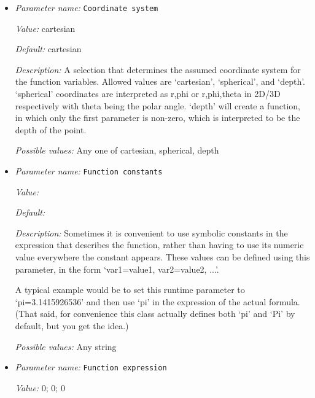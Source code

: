 \begin{itemize}
\item {\it Parameter name:} {\tt Coordinate system}
\label{parameters:Boundary traction model/Function/Coordinate system}
\label{parameters:Boundary_20traction_20model/Function/Coordinate_20system}


{\it Value:} cartesian


{\it Default:} cartesian


{\it Description:} A selection that determines the assumed coordinate system for the function variables. Allowed values are `cartesian', `spherical', and `depth'. `spherical' coordinates are interpreted as r,phi or r,phi,theta in 2D/3D respectively with theta being the polar angle. `depth' will create a function, in which only the first parameter is non-zero, which is interpreted to be the depth of the point.


{\it Possible values:} Any one of cartesian, spherical, depth
\item {\it Parameter name:} {\tt Function constants}
\label{parameters:Boundary traction model/Function/Function constants}
\label{parameters:Boundary_20traction_20model/Function/Function_20constants}


{\it Value:} 


{\it Default:} 


{\it Description:} Sometimes it is convenient to use symbolic constants in the expression that describes the function, rather than having to use its numeric value everywhere the constant appears. These values can be defined using this parameter, in the form `var1=value1, var2=value2, ...'.

A typical example would be to set this runtime parameter to `pi=3.1415926536' and then use `pi' in the expression of the actual formula. (That said, for convenience this class actually defines both `pi' and `Pi' by default, but you get the idea.)


{\it Possible values:} Any string
\item {\it Parameter name:} {\tt Function expression}
\label{parameters:Boundary traction model/Function/Function expression}
\label{parameters:Boundary_20traction_20model/Function/Function_20expression}


{\it Value:} 0; 0; 0



\end{itemize}
